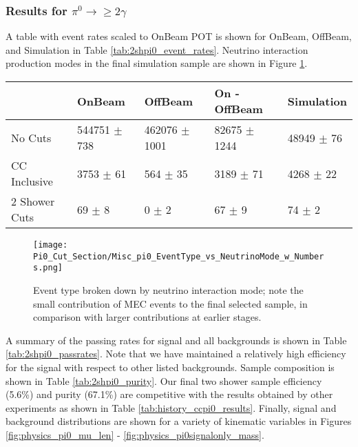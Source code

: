 \clearpage
\subsubsection{Results for $\pi^0\rightarrow \geq 2 \gamma$}
\par A table with event rates scaled to OnBeam POT is shown for OnBeam, OffBeam, and Simulation in Table \ref{tab:2shpi0_event_rates}. Neutrino interaction production modes in the final simulation sample are shown in Figure \ref{fig:physics_2shower_inttype}. 

\begin{table}[H] 
 \centering
 \begin{tabular}{| l | l | l | l | l |}
  \hline
   & OnBeam & OffBeam & On - OffBeam & Simulation \\ [0.1ex] \hline
No Cuts & 544751 $\pm$ 738 & 462076 $\pm$ 1001 & 82675 $\pm$ 1244 & 48949 $\pm$ 76 \\ 
CC Inclusive & 3753 $\pm$ 61 & 564 $\pm$ 35 & 3189 $\pm$ 71 & 4268 $\pm$ 22 \\ 
2 Shower Cuts & 69 $\pm$ 8 & 0 $\pm$ 2 & 67 $\pm$ 9 & 74 $\pm$ 2  \\ \hline
\end{tabular}
 \end{table}



\begin{figure}[H]
\centering
\texttt{[image: Pi0\_Cut\_Section/Misc\_pi0\_EventType\_vs\_NeutrinoMode\_w\_Numbers.png]}
\caption{ Event type broken down by neutrino interaction mode; note the small contribution of MEC events to the final selected sample, in comparison with larger contributions at earlier stages. }
\label{fig:physics_2shower_inttype}
\end{figure}

\par A summary of the passing rates for signal and all backgrounds is shown in Table \ref{tab:2shpi0_passrates}.  Note that we have maintained a relatively high efficiency for the signal with respect to other listed backgrounds. Sample composition is shown in Table \ref{tab:2shpi0_purity}. Our final two shower sample efficiency (5.6\%) and purity (67.1\%) are competitive with the results obtained by other experiments as shown in Table \ref{tab:history_ccpi0_results}.   Finally, signal and background distributions are shown for a variety of kinematic variables in Figures \ref{fig:physics_pi0_mu_len} - \ref{fig:physics_pi0signalonly_mass}. 

